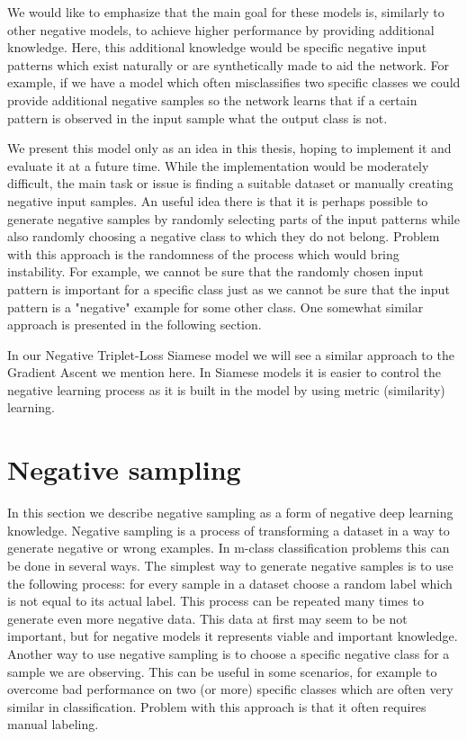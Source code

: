 \documentclass[b5paper]{book}
\begin{document}
We would like to emphasize that the main goal for these models is, similarly to other negative models, to achieve higher performance by providing additional knowledge. Here, this additional knowledge would be specific negative input patterns which exist naturally or are synthetically made to aid the network. For example, if we have a model which often misclassifies two specific classes we could provide additional negative samples so the network learns that if a certain pattern is observed in the input sample what the output class is not. 

We present this model only as an idea in this thesis, hoping to implement it and evaluate it at a future time. While the implementation would be moderately difficult, the main task or issue is finding a suitable dataset or manually creating negative input samples. An useful idea there is that it is perhaps possible to generate negative samples by randomly selecting parts of the input patterns while also randomly choosing a negative class to which they do not belong. Problem with this approach is the randomness of the process which would bring instability. For example, we cannot be sure that the randomly chosen input pattern is important for a specific class just as we cannot be sure that the input pattern is a "negative" example for some other class. One somewhat similar approach is presented in the following section. 

In our Negative Triplet-Loss Siamese model we will see a similar approach to the Gradient Ascent we mention here. In Siamese models it is easier to control the negative learning process as it is built in the model by using metric (similarity) learning.

\section{Negative sampling}
\label{negsampling}

In this section we describe negative sampling as a form of negative deep learning knowledge. Negative sampling is a process of transforming a dataset in a way to generate negative or wrong examples. In m-class classification problems this can be done in several ways. The simplest way to generate negative samples is to use the following process: for every sample in a dataset choose a random label which is not equal to its actual label. This process can be repeated many times to generate even more negative data. This data at first may seem to be not important, but for negative models it represents viable and important knowledge. Another way to use negative sampling is to choose a specific negative class for a sample we are observing. This can be useful in some scenarios, for example to overcome bad performance on two (or more) specific classes which are often very similar in classification. Problem with this approach is that it often requires manual labeling.
\end{document}
